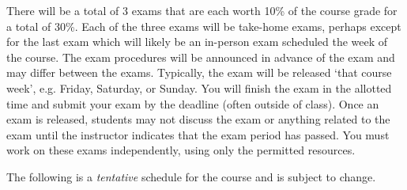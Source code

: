 \documentclass[11pt,letterpaper]{article}
\begin{document}
There will be a total of 3 exams that are each worth 10\% of the course grade for a total of 30\%. Each of the three exams will be take-home exams, perhaps except for the last exam which will likely be an in-person exam scheduled the week of the course. The exam procedures will be announced in advance of the exam and may differ between the exams. Typically, the exam will be released `that course week', e.g. Friday, Saturday, or Sunday. You will finish the exam in the allotted time and submit your exam by the deadline (often outside of class). Once an exam is released, students may not discuss the exam or anything related to the exam until the instructor indicates that the exam period has passed. You must work on these exams independently, using only the permitted resources. \pspace


The following is a \emph{tentative} schedule for the course and is subject to change. 
        \begin{table}[!ht]
        \centering
        \end{table}
\end{document}
